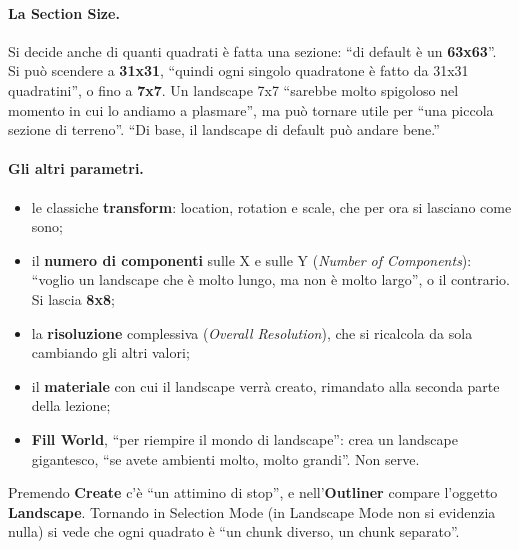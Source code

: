 \paragraph{La Section Size.} Si decide anche di quanti quadrati è fatta una sezione: ``di
default è un \textbf{63x63}''. Si può scendere a \textbf{31x31}, ``quindi ogni singolo
quadratone è fatto da 31x31 quadratini'', o fino a \textbf{7x7}. Un landscape 7x7 ``sarebbe
molto spigoloso nel momento in cui lo andiamo a plasmare'', ma può tornare utile per ``una
piccola sezione di terreno''. ``Di base, il landscape di default può andare bene.''

\paragraph{Gli altri parametri.}
\begin{itemize}
  \item le classiche \textbf{transform}: location, rotation e scale, che per ora si
        lasciano come sono;
  \item il \textbf{numero di componenti} sulle X e sulle Y (\emph{Number of Components}):
        ``voglio un landscape che è molto lungo, ma non è molto largo'', o il contrario. Si
        lascia \textbf{8x8};
  \item la \textbf{risoluzione} complessiva (\emph{Overall Resolution}), che si ricalcola da
        sola cambiando gli altri valori;
  \item il \textbf{materiale} con cui il landscape verrà creato, rimandato alla seconda
        parte della lezione;
  \item \textbf{Fill World}, ``per riempire il mondo di landscape'': crea un landscape
        gigantesco, ``se avete ambienti molto, molto grandi''. Non serve.
\end{itemize}
Premendo \textbf{Create} c'è ``un attimino di stop'', e nell'\textbf{Outliner} compare
l'oggetto \textbf{Landscape}. Tornando in Selection Mode (in Landscape Mode non si
evidenzia nulla) si vede che ogni quadrato è ``un chunk diverso, un chunk separato''.

